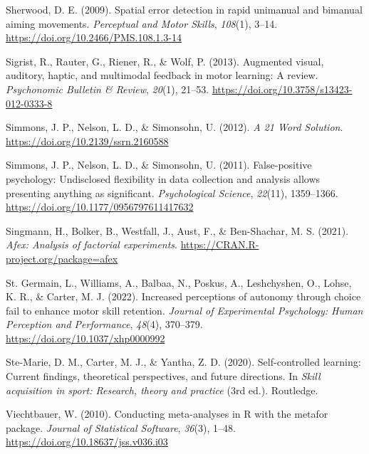 \documentclass[
  doc, donotrepeattitle,floatsintext]{apa7}
\newlength{\cslhangindent}
\newlength{\cslentryspacingunit} %
\newenvironment{CSLReferences}[2] %
 {%
  \setlength{\parindent}{0pt}
  \ifodd #1
  \let\oldpar\par
  \def\par{\hangindent=\cslhangindent\oldpar}
  \fi
  \setlength{\parskip}{#2\cslentryspacingunit}
 }%
 {}
\begin{document}
\begin{CSLReferences}{1}{0}
\leavevmode{}%
Sherwood, D. E. (2009). Spatial error detection in rapid unimanual and bimanual aiming movements. \emph{Perceptual and Motor Skills}, \emph{108}(1), 3--14. \url{https://doi.org/10.2466/PMS.108.1.3-14}

\leavevmode{}%
Sigrist, R., Rauter, G., Riener, R., \& Wolf, P. (2013). Augmented visual, auditory, haptic, and multimodal feedback in motor learning: A review. \emph{Psychonomic Bulletin \& Review}, \emph{20}(1), 21--53. \url{https://doi.org/10.3758/s13423-012-0333-8}

\leavevmode{}%
Simmons, J. P., Nelson, L. D., \& Simonsohn, U. (2012). \emph{A 21 Word Solution}. \url{https://doi.org/10.2139/ssrn.2160588}

\leavevmode{}%
Simmons, J. P., Nelson, L. D., \& Simonsohn, U. (2011). False-positive psychology: Undisclosed flexibility in data collection and analysis allows presenting anything as significant. \emph{Psychological Science}, \emph{22}(11), 1359--1366. \url{https://doi.org/10.1177/0956797611417632}

\leavevmode{}%
Singmann, H., Bolker, B., Westfall, J., Aust, F., \& Ben-Shachar, M. S. (2021). \emph{Afex: Analysis of factorial experiments}. \url{https://CRAN.R-project.org/package=afex}

\leavevmode{}%
St. Germain, L., Williams, A., Balbaa, N., Poskus, A., Leshchyshen, O., Lohse, K. R., \& Carter, M. J. (2022). Increased perceptions of autonomy through choice fail to enhance motor skill retention. \emph{Journal of Experimental Psychology: Human Perception and Performance}, \emph{48}(4), 370--379. \url{https://doi.org/10.1037/xhp0000992}

\leavevmode{}%
Ste-Marie, D. M., Carter, M. J., \& Yantha, Z. D. (2020). Self-controlled learning: {Current} findings, theoretical perspectives, and future directions. In \emph{Skill acquisition in sport: Research, theory and practice} (3rd ed.). {Routledge}.

\leavevmode{}%
Viechtbauer, W. (2010). Conducting meta-analyses in {R} with the {metafor} package. \emph{Journal of Statistical Software}, \emph{36}(3), 1--48. \url{https://doi.org/10.18637/jss.v036.i03}


\end{CSLReferences}
\end{document}
